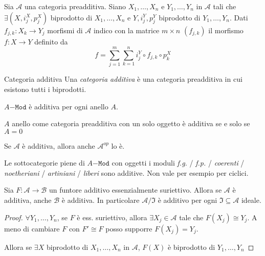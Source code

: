 \begin{note}
    Sia \(\mathcal{A}\) una categoria preadditiva. Siano \(X_{1}, \dots, X_{n}\) e \(Y_{1},\dots, Y_{n}\) in \(\mathcal{A}\) tali che \(\exists {(X, i_j^{X}, p_j^{X})}\) biprodotto di \(X_{1}, \dots, X_{n}\) 
    e \(Y, i_j^{Y}, p_j^{Y}\) biprodotto di \(Y_{1}, \dots, Y_{n}\).
    Dati \(f_{j,k}  : X_k\to Y_j \) morfismi di \(\mathcal{A}\) indico con la
    matrice \(m \times  n\) \({(f_{j,k} )}\) il morfismo \(f: X\to Y\)
    definito da
    \[
      f = \sum_{j=1}^{m} \sum_{k=1}^{n} i_j^{Y} \circ f_{j, k} \circ p_k^{X}
    \]
\end{note}

\begin{definition}{Categoria additiva}
    Una \emph{categoria additiva} è una categoria preadditiva in cui esistono
    tutti i biprodotti.
\end{definition}

\begin{example}{}
    \(A\mathtt{-Mod}\) è additiva per ogni anello \(A\).
\end{example}
\begin{example}{}
    \(A\) anello come categoria preadditiva con un solo oggetto è additiva se e solo se
    \(A=0\) 
\end{example}

\begin{remark}{}
    Se \(\mathcal{A}\) è additiva, allora anche \(\mathcal{A}^{op}\) lo è.
\end{remark}

\begin{example}{}
    Le sottocategorie piene di \(A\mathtt{-Mod}\) con oggetti i moduli
    \emph{f.g.} / \emph{f.p.} / \emph{coerenti} / \emph{noetheriani} /
    \emph{artiniani} / \emph{liberi} sono additive. Non vale per esempio per
    ciclici.
\end{example}

\begin{proposition}{}
    Sia \(F: \mathcal{A} \to \mathcal{B}\) un funtore additivo essenzialmente
    suriettivo. Allora se \(\mathcal{A}\) è additiva, anche \(\mathcal{B}\) è
    additiva. In particolare \(\mathcal{A}/\mathfrak{I}\) è additivo per ogni \(\mathfrak{I} \subseteq \mathcal{A} \) 
    ideale.
\end{proposition}

\begin{proof}{}
    \(\forall Y_{1}, \dots, Y_{n}\), se \(F\) è ess. suriettivo, allora \(\exists X_{j} \in \mathcal{A}\) 
    tale che \(F{(X_{j})} \cong Y_j\). A meno di cambiare \(F\) con \(F' \cong F\) 
    posso supporre \(F {(X_{j})} = Y_{j}\).

    Allora se \(\exists X\) biprodotto di \(X_{1}, \dots, X_{n}\) in \(\mathcal{A}\), \(F{(X)}\) è 
    biprodotto di \(Y_{1}, \dots, Y_{n}\) 
\end{proof}

